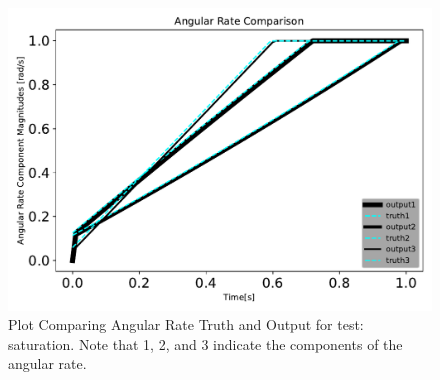 \begin{figure}[htbp]\centerline{\includegraphics[height=0.7\textwidth, keepaspectratio]{AutoTeX/saturationomegaComparison}}\caption{Plot Comparing Angular Rate Truth and Output for test: saturation. Note that 1, 2, and 3 indicate the components of the angular rate.}\label{fig:saturationomegaComparison}\end{figure}